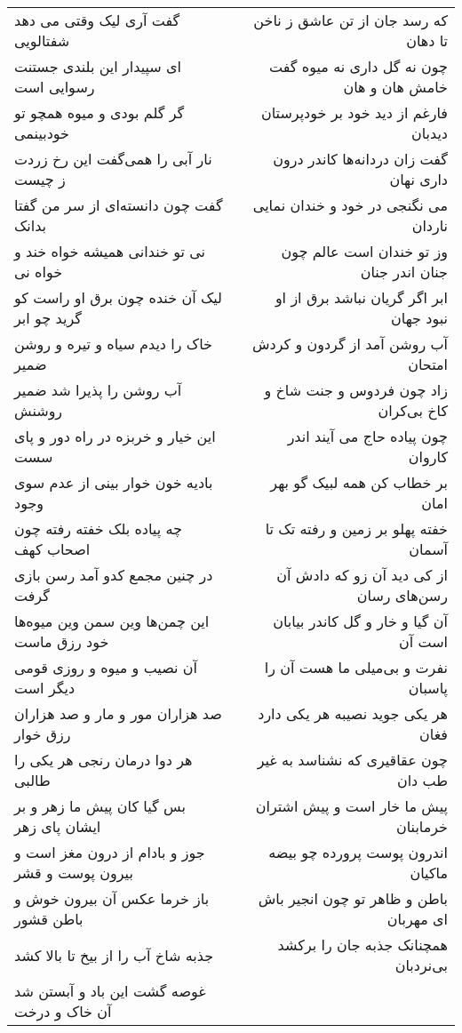 \begin{center}
\begin{longtable}{l p{0.5cm} r}
\\
گفت آری لیک وقتی می دهد شفتالویی
&&
که رسد جان از تن عاشق ز ناخن تا دهان
\\
ای سپیدار این بلندی جستنت رسوایی است
&&
چون نه گل داری نه میوه گفت خامش هان و هان
\\
گر گلم بودی و میوه همچو تو خودبینمی
&&
فارغم از دید خود بر خودپرستان دیدبان
\\
نار آبی را همی‌گفت این رخ زردت ز چیست
&&
گفت زان دردانه‌ها کاندر درون داری نهان
\\
گفت چون دانسته‌ای از سر من گفتا بدانک
&&
می نگنجی در خود و خندان نمایی ناردان
\\
نی تو خندانی همیشه خواه خند و خواه نی
&&
وز تو خندان است عالم چون جنان اندر جنان
\\
لیک آن خنده چون برق او راست کو گرید چو ابر
&&
ابر اگر گریان نباشد برق از او نبود جهان
\\
خاک را دیدم سیاه و تیره و روشن ضمیر
&&
آب روشن آمد از گردون و کردش امتحان
\\
آب روشن را پذیرا شد ضمیر روشنش
&&
زاد چون فردوس و جنت شاخ و کاخ بی‌کران
\\
این خیار و خربزه در راه دور و پای سست
&&
چون پیاده حاج می آیند اندر کاروان
\\
بادیه خون خوار بینی از عدم سوی وجود
&&
بر خطاب کن همه لبیک گو بهر امان
\\
چه پیاده بلک خفته رفته چون اصحاب کهف
&&
خفته پهلو بر زمین و رفته تک تا آسمان
\\
در چنین مجمع کدو آمد رسن بازی گرفت
&&
از کی دید آن زو که دادش آن رسن‌های رسان
\\
این چمن‌ها وین سمن وین میوه‌ها خود رزق ماست
&&
آن گیا و خار و گل کاندر بیابان است آن
\\
آن نصیب و میوه و روزی قومی دیگر است
&&
نفرت و بی‌میلی ما هست آن را پاسبان
\\
صد هزاران مور و مار و صد هزاران رزق خوار
&&
هر یکی جوید نصیبه هر یکی دارد فغان
\\
هر دوا درمان رنجی هر یکی را طالبی
&&
چون عقاقیری که نشناسد به غیر طب دان
\\
بس گیا کان پیش ما زهر و بر ایشان پای زهر
&&
پیش ما خار است و پیش اشتران خرمابنان
\\
جوز و بادام از درون مغز است و بیرون پوست و قشر
&&
اندرون پوست پرورده چو بیضه ماکیان
\\
باز خرما عکس آن بیرون خوش و باطن قشور
&&
باطن و ظاهر تو چون انجیر باش ای مهربان
\\
جذبه شاخ آب را از بیخ تا بالا کشد
&&
همچنانک جذبه جان را برکشد بی‌نردبان
\\
غوصه گشت این باد و آبستن شد آن خاک و درخت

\end{longtable}
\end{center}
